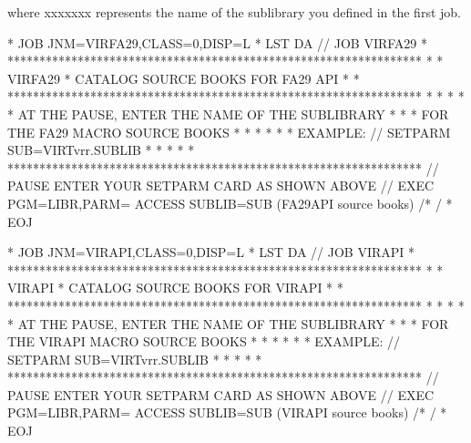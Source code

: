 \documentclass[letterpaper,10pt,english]{sphinxmanual}
\begin{document}
\sphinxAtStartPar
where  xxxxxxx represents the name of the sublibrary you defined in the first job.

\begin{sphinxVerbatim}[commandchars=\\\{\}]
* \PYGZdl{}\PYGZdl{} JOB JNM=VIRFA29,CLASS=0,DISP=L
* \PYGZdl{}\PYGZdl{} LST DA
// JOB VIRFA29
* *****************************************************************
* * VIRFA29 * CATALOG SOURCE BOOKS FOR FA29 API                   *
* *****************************************************************
* *                                                               *
* * AT THE PAUSE, ENTER THE NAME OF THE SUB\PYGZhy{}LIBRARY               *
* * FOR THE FA29 MACRO SOURCE BOOKS                               *
* *                                                               *
* * EXAMPLE: // SETPARM SUB=\PYGZsq{}VIRTvrr.SUBLIB\PYGZsq{}                      *
* *                                                               *
* *****************************************************************
// PAUSE ENTER YOUR SETPARM CARD AS SHOWN ABOVE
// EXEC PGM=LIBR,PARM=\PYGZsq{} ACCESS SUBLIB=\PYGZam{}SUB\PYGZsq{}
        (FA29API source books)
/*
/\PYGZam{}
* \PYGZdl{}\PYGZdl{} EOJ
\end{sphinxVerbatim}

\sphinxAtStartPar
{}

\begin{sphinxVerbatim}[commandchars=\\\{\}]
* \PYGZdl{}\PYGZdl{} JOB JNM=VIRAPI,CLASS=0,DISP=L
* \PYGZdl{}\PYGZdl{} LST DA
// JOB VIRAPI
* *****************************************************************
* * VIRAPI * CATALOG SOURCE BOOKS FOR VIRAPI                      *
* *****************************************************************
* *                                                               *
* * AT THE PAUSE, ENTER THE NAME OF THE SUB\PYGZhy{}LIBRARY               *
* * FOR THE VIRAPI MACRO SOURCE BOOKS                             *
* *                                                               *
* * EXAMPLE: // SETPARM SUB=\PYGZsq{}VIRTvrr.SUBLIB\PYGZsq{}                      *
* *                                                               *
* *****************************************************************
// PAUSE ENTER YOUR SETPARM CARD AS SHOWN ABOVE
// EXEC PGM=LIBR,PARM=\PYGZsq{} ACCESS SUBLIB=\PYGZam{}SUB\PYGZsq{}
        (VIRAPI source books)
/*
/\PYGZam{}
* \PYGZdl{}\PYGZdl{} EOJ
\end{sphinxVerbatim}
\end{document}

